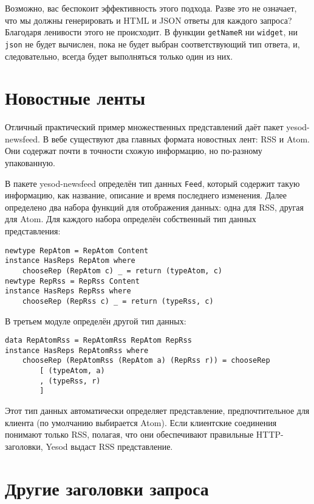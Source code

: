 Возможно, вас беспокоит эффективность этого подхода. Разве это не означает, что мы должны
генерировать и HTML и JSON ответы для каждого запроса? Благодаря ленивости этого не
происходит. В функции \lstinline'getNameR' ни \lstinline'widget', ни \lstinline'json' не
будет вычислен, пока не будет выбран соответствующий тип ответа, и, следовательно, всегда
будет выполняться только один из них.

\section{Новостные ленты}

Отличный практический пример множественных представлений даёт пакет yesod-newsfeed. В вебе существуют два главных формата новостных лент: RSS и Atom. Они содержат почти в точности схожую информацию, но по-разному упакованную.

В пакете yesod-newsfeed определён тип данных \lstinline'Feed', который содержит такую информацию, как название, описание и время последнего изменения. Далее определено два набора функций для отображения данных: одна для RSS, другая для Atom. Для каждого набора определён собственный тип данных представления:

\begin{lstlisting}
newtype RepAtom = RepAtom Content
instance HasReps RepAtom where
    chooseRep (RepAtom c) _ = return (typeAtom, c)
newtype RepRss = RepRss Content
instance HasReps RepRss where
    chooseRep (RepRss c) _ = return (typeRss, c)
\end{lstlisting}

В третьем модуле определён другой тип данных:

\begin{lstlisting}
data RepAtomRss = RepAtomRss RepAtom RepRss
instance HasReps RepAtomRss where
    chooseRep (RepAtomRss (RepAtom a) (RepRss r)) = chooseRep
        [ (typeAtom, a)
        , (typeRss, r)
        ]
\end{lstlisting}

Этот тип данных автоматически определяет представление, предпочтительное для клиента (по умолчанию выбирается Atom). Если клиентские соединения понимают только RSS, полагая, что они обеспечивают правильные HTTP-заголовки, Yesod выдаст RSS представление.

\section{Другие заголовки запроса}

